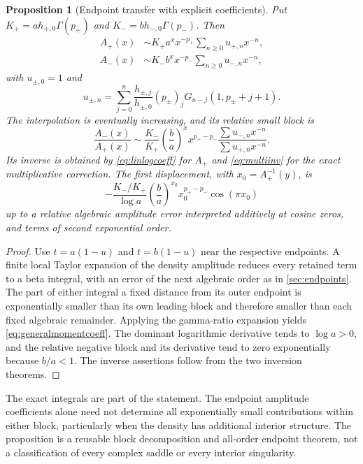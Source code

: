 \documentclass[11pt,a4paper]{article}
\newtheorem{proposition}[theorem]{Proposition}
\theoremstyle{definition}
\theoremstyle{remark}
\numberwithin{equation}{section}
\begin{document}
\begin{proposition}[Endpoint transfer with explicit coefficients]
Put $K_+=a h_{+,0}\Gamma(p_+)$ and $K_-=b h_{-,0}\Gamma(p_-)$. Then
\begin{align}
 A_+(x)&\sim K_+a^xx^{-p_+}\sum_{n\ge0}u_{+,n}x^{-n},\nonumber\\
 A_-(x)&\sim K_-b^xx^{-p_-}\sum_{n\ge0}u_{-,n}x^{-n},
 \label{eq:generalmomentblocks}
\end{align}
with $u_{\pm,0}=1$ and
\begin{equation}
 u_{\pm,n}=\sum_{j=0}^n
 \frac{h_{\pm,j}}{h_{\pm,0}}(p_\pm)_j
 G_{n-j}(1,p_\pm+j+1).
 \label{eq:generalmomentcoeff}
\end{equation}
The interpolation is eventually increasing, and its relative small block is
\begin{equation}
 \frac{A_-(x)}{A_+(x)}\sim
 \frac{K_-}{K_+}\left(\frac ba\right)^x
 x^{p_+-p_-}\frac{\sum u_{-,n}x^{-n}}{\sum u_{+,n}x^{-n}}.
 \label{eq:generalmomentr}
\end{equation}
Its inverse is obtained by \eqref{eq:linlogcoeff} for $A_+$ and \eqref{eq:multiinv} for the exact multiplicative correction. The first displacement, with $x_0=A_+^{-1}(y)$, is
\begin{equation}
 -\frac{K_-/K_+}{\log a}
 \left(\frac ba\right)^{x_0}x_0^{p_+-p_-}\cos(\pi x_0)
\end{equation}
up to a relative algebraic amplitude error interpreted additively at cosine zeros, and terms of second exponential order.
\end{proposition}
\begin{proof}
Use $t=a(1-u)$ and $t=b(1-u)$ near the respective endpoints. A finite local Taylor expansion of the density amplitude reduces every retained term to a beta integral, with an error of the next algebraic order as in \cref{sec:endpoints}. The part of either integral a fixed distance from its outer endpoint is exponentially smaller than its own leading block and therefore smaller than each fixed algebraic remainder. Applying the gamma-ratio expansion yields \eqref{eq:generalmomentcoeff}. The dominant logarithmic derivative tends to $\log a>0$, and the relative negative block and its derivative tend to zero exponentially because $b/a<1$. The inverse assertions follow from the two inversion theorems.
\end{proof}

The exact integrals are part of the statement. The endpoint amplitude coefficients alone need not determine all exponentially small contributions within either block, particularly when the density has additional interior structure. The proposition is a reusable block decomposition and all-order endpoint theorem, not a classification of every complex saddle or every interior singularity.
\end{document}
